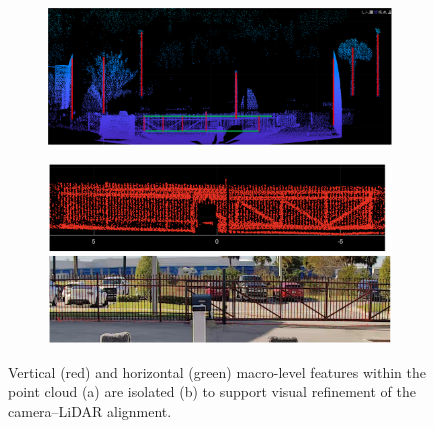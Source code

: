 \documentclass{erauthesis}
\begin{document}
\begin{figure}[htp]
\begin{subfigure}{\textwidth}
\centering
\includegraphics[width=0.94\linewidth]{Images/LiDAR_features.png}
    \caption{}
\end{subfigure}
\bigskip
\begin{subfigure}{\textwidth}
\centering
\includegraphics[width=0.94\linewidth]{Images/LiDAR_calib_fence.png}
    \caption{}
\end{subfigure}
\caption{Vertical (red) and horizontal (green) macro-level features within the point cloud (a) are isolated (b) to support visual refinement of the camera–LiDAR alignment.}
\end{figure}
\end{document}
